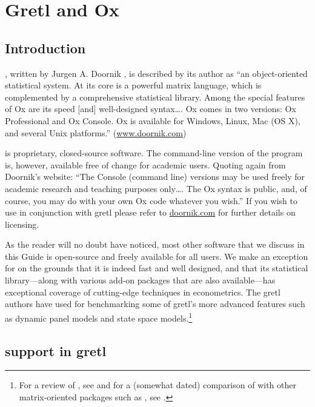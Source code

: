 \chapter{Gretl and Ox}
\label{chap:gretlOx}

\section{Introduction}
\label{Ox-intro}

, written by Jurgen A. Doornik \citep[see][]{doornik07}, is
described by its author as ``an object-oriented statistical system. At
its core is a powerful matrix language, which is complemented by a
comprehensive statistical library. Among the special features of Ox
are its speed [and] well-designed syntax\dots{}.  Ox comes in two
versions: Ox Professional and Ox Console. Ox is available for Windows,
Linux, Mac (OS X), and several Unix platforms.''
(\url{www.doornik.com})

 is proprietary, closed-source software.  The command-line
version of the program is, however, available free of change for
academic users.  Quoting again from Doornik's website: ``The
Console (command line) versions may be used freely for academic
research and teaching purposes only\dots{}. The Ox syntax is public,
and, of course, you may do with your own Ox code whatever you wish.''
If you wish to use  in conjunction with gretl please
refer to \url{doornik.com} for further details on licensing.

As the reader will no doubt have noticed, most other software that
we discuss in this Guide is open-source and freely available for all
users.  We make an exception for  on the grounds that it is
indeed fast and well designed, and that its statistical
library---along with various add-on packages that are also
available---has exceptional coverage of cutting-edge techniques in
econometrics.  The gretl authors have used  for benchmarking
some of gretl's more advanced features such as dynamic panel models
and state space models.\footnote{For a review of , see
  \cite{cribari-neto03} and for a (somewhat dated) comparison of
   with other matrix-oriented packages such as ,
  see \cite{steinhaus99}.}

\section{ support in gretl}
\label{sec:Ox-support}

